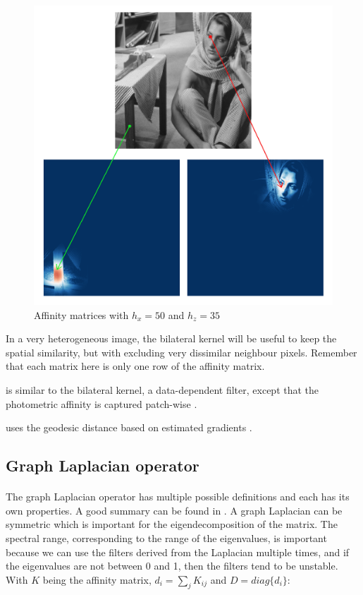 \begin{description}[align=left]
  \begin{figure}[H]
      \centering
      \includegraphics[width=\textwidth]{img/bilateralAffinityPhoto35Spatial50.png}
      \caption{Affinity matrices with \(h_x = 50\) and \(h_z = 35\)}
  \end{figure}
  In a very heterogeneous image, the bilateral kernel will be useful to keep the spatial similarity, but with excluding very dissimilar neighbour pixels.
  Remember that each matrix here is only one row of the affinity matrix.

 \item [Non-Local Means (NLM)] is similar to the bilateral kernel, a data-dependent filter, except that the photometric affinity is captured patch-wise \cite{glide_2014} \cite{kervrann_nlm_2006}.
 \item [Locally Adaptive Regression Kernel (LARK)] uses the geodesic distance based on estimated gradients \cite{milanfar_symmetrizing_2013} \cite{takeda_kernel_2007}.
\end{description}

\subsection{Graph Laplacian operator}

\paragraph{}
The graph Laplacian operator has multiple possible definitions and each has its own properties.
A good summary can be found in \cite{siam_slides_2016}.
A graph Laplacian can be symmetric which is important for the eigendecomposition of the matrix.
The spectral range, corresponding to the range of the eigenvalues, is important because we can use the filters derived from the Laplacian multiple times, and if the eigenvalues are not between 0 and 1, then the filters tend to be unstable.
With \(K\) being the affinity matrix, \(d_i = \sum_j K_{ij}\) and \(D = diag\{d_i\}\):

